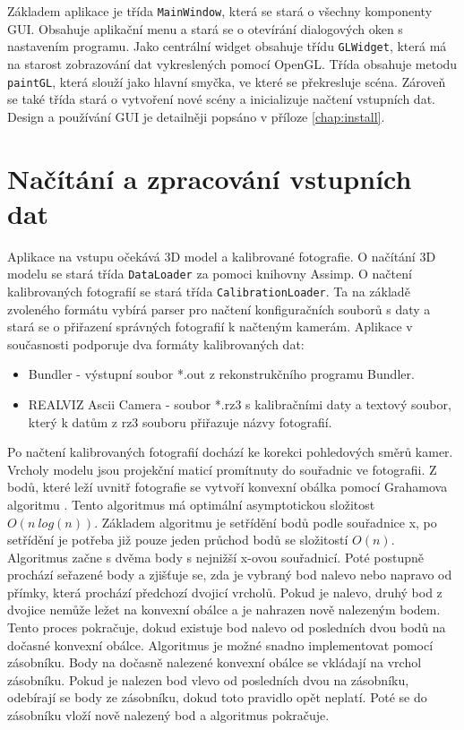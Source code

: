 \documentclass[11pt,twoside,a4paper]{book}
\begin{document}
Základem aplikace je třída \texttt{MainWindow}, která se stará o všechny komponenty GUI. Obsahuje aplikační menu a stará se o otevírání dialogových oken s nastavením programu. Jako centrální widget obsahuje třídu \texttt{GLWidget}, která má na starost zobrazování dat vykreslených pomocí OpenGL. Třída obsahuje metodu \texttt{paintGL}, která slouží jako hlavní smyčka, ve které se překresluje scéna. Zároveň se také třída  stará o vytvoření nové scény a inicializuje načtení vstupních dat. Design a používání GUI je detailněji popsáno v příloze \ref{chap:install}.


\section{Načítání a zpracování vstupních dat}

Aplikace na vstupu očekává 3D model a kalibrované fotografie. O načítání 3D modelu se stará třída \texttt{DataLoader} za pomoci knihovny Assimp. O načtení kalibrovaných fotografií se stará třída \texttt{CalibrationLoader}. Ta na základě zvoleného formátu vybírá parser pro načtení konfiguračních souborů s daty a stará se o přiřazení správných fotografií k načteným kamerám. Aplikace v současnosti podporuje dva formáty kalibrovaných dat:
\begin{itemize}
\item Bundler - výstupní soubor *.out z rekonstrukčního programu Bundler.
\item REALVIZ Ascii Camera - soubor *.rz3 s kalibračními daty a textový soubor, který k datům z rz3 souboru přiřazuje názvy fotografií.
\end{itemize}

Po načtení kalibrovaných fotografií dochází ke korekci pohledových směrů kamer. Vrcholy modelu jsou projekční maticí promítnuty do souřadnic ve fotografii. Z bodů, které leží uvnitř fotografie se vytvoří konvexní obálka pomocí Grahamova algoritmu \cite{Andrew79}.  Tento algoritmus má optimální asymptotickou složitost $O(n~log(n))$. Základem algoritmu je setřídění bodů podle souřadnice x, po setřídění je potřeba již pouze jeden průchod bodů se složitostí $O(n)$. Algoritmus začne s dvěma body s nejnižší x-ovou souřadnicí. Poté postupně prochází seřazené body a zjišťuje se, zda je vybraný bod nalevo nebo napravo od přímky, která prochází předchozí dvojicí vrcholů. Pokud je nalevo, druhý bod z dvojice nemůže ležet na konvexní obálce a je nahrazen nově nalezeným bodem. Tento proces pokračuje, dokud existuje bod nalevo od posledních dvou bodů na dočasné konvexní obálce. Algoritmus je možné snadno implementovat pomocí zásobníku. Body na dočasně nalezené konvexní obálce se vkládají na vrchol zásobníku. Pokud je nalezen bod vlevo od posledních dvou na zásobníku, odebírají se body ze zásobníku, dokud toto pravidlo opět neplatí. Poté se do zásobníku vloží nově nalezený bod a algoritmus pokračuje.
\end{document}

